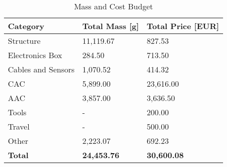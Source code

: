 
\begin{table}[H]
\centering
\begin{tabular}{|m{3.5cm}|m{3.5cm}|m{3.5cm}|}
\hline

\textbf{Category} & \textbf{Total Mass [g]} & \textbf{Total Price [EUR]} \\ \hline
Structure & 11,119.67 & 827.53 \\ \hline
Electronics Box & 284.50 & 713.50 \\ \hline
Cables and Sensors & 1,070.52 & 414.32 \\ \hline
CAC & 5,899.00 & 23,616.00 \\ \hline
AAC & 3,857.00 & 3,636.50 \\ \hline
Tools & - & 200.00 \\ \hline
Travel & - & 500.00 \\ \hline
Other & 2,223.07 & 692.23 \\ \hline
{\textbf{Total}} & \textbf{24,453.76} & \textbf{30,600.08} \\ \hline
\end{tabular}
\caption{Mass and Cost Budget}
\label{table:mass-and-cost-budget}
\end{table}

\raggedbottom